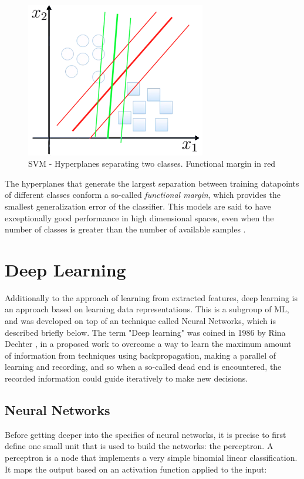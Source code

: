 \begin{figure}[!htb]
    \centering
      \includegraphics[width=0.7\textwidth]{figures/svm}
      \caption{\ac{SVM} - Hyperplanes separating two classes. Functional margin in red}
      \label{fig:dt_example}
\end{figure}
The hyperplanes that generate the largest separation between training datapoints of different classes conform a so-called \emph{functional margin}, which provides the smallest generalization error of the classifier. This models are said to have exceptionally good performance in high dimensional spaces, even when the number of classes is greater than the number of available samples \cite{SKLEARN}.

\section{Deep Learning}
Additionally to the approach of learning from extracted features, deep learning is an approach based on learning data representations. This is a subgroup of \ac{ML}, and was developed on top of an technique called Neural Networks, which is described briefly below. The term "Deep learning" was coined in 1986 by Rina Dechter \cite{Dechter}, in a proposed work to overcome a way to learn the maximum amount of information from techniques using backpropagation, making a parallel of learning and recording, and so when a so-called dead end is encountered, the recorded information could guide iteratively to make new decisions.

\subsection{Neural Networks}\label{ch:neural}
Before getting deeper into the specifics of neural networks, it is precise to first define one small unit that is used to build the networks: the perceptron. A perceptron is a node that implements a very simple binomial linear classification. It maps the output based on an activation function applied to the input:

